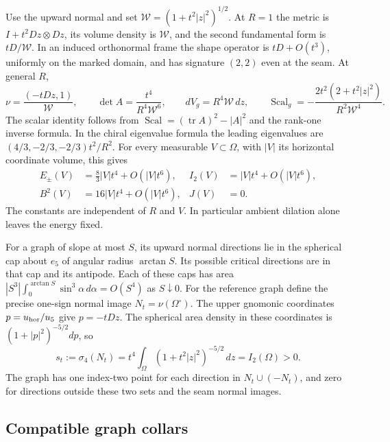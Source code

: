 \documentclass[11pt,letterpaper]{article}
\numberwithin{equation}{section}
\theoremstyle{definition}
\DeclareMathOperator{\Scal}{Scal}
\begin{document}
Use the upward normal and set \(\mathcal W=(1+t^2|z|^2)^{1/2}\).
At \(R=1\) the metric is \(I+t^2Dz\otimes Dz\), its volume
density is \(\mathcal W\), and the second fundamental form is
\(tD/\mathcal W\). In an induced orthonormal frame the shape operator
is \(tD+O(t^3)\), uniformly on the marked domain, and has signature
\((2,2)\) even at the seam. At general \(R\),
\[
 \nu=\frac{(-tDz,1)}{\mathcal W},\qquad
 \det A=\frac{t^4}{R^4\mathcal W^6},\qquad
 dV_g=R^4\mathcal W\,dz,\qquad
 \Scal_g=-\frac{2t^2(2+t^2|z|^2)}{R^2\mathcal W^4}.
\]
The scalar identity follows from
\(\Scal=(\operatorname{tr}A)^2-|A|^2\) and the rank-one
inverse formula. In the chiral eigenvalue formula the leading
eigenvalues are \( (4/3,-2/3,-2/3)t^2/R^2\).
For every measurable \(V\subset\Omega\), with \(|V|\) its
horizontal coordinate volume, this gives
\begin{equation}\label{eq:scale}
 \begin{aligned}
 E_\pm(V)&=\tfrac83 |V|t^4+O(|V|t^6),&
 I_2(V)&=|V|t^4+O(|V|t^6),\\
 B^2(V)&=16|V|t^4+O(|V|t^6),& J(V)&=0 .
 \end{aligned}
\end{equation}
The constants are independent of \(R\) and \(V\). In particular
ambient dilation alone leaves the energy fixed.

For a graph of slope at most \(S\), its upward normal directions
lie in the spherical cap about \(e_5\) of angular radius
\(\arctan S\). Its possible critical directions are in that
cap and its antipode. Each of these caps has area
\(|S^3|\int_0^{\arctan S}\sin^3\alpha\,d\alpha=O(S^4)\)
as \(S\downarrow0\). For the reference graph define the precise
one-sign normal image \(N_t=\nu(\Omega^\circ)\). The upper
gnomonic coordinates \(p=u_{\rm hor}/u_5\) give \(p=-tDz\).
The spherical area density in these coordinates is
\((1+|p|^2)^{-5/2}dp\), so
\begin{equation}\label{eq:normal-area}
       s_t:=\sigma_4(N_t)
       =t^4\int_\Omega(1+t^2|z|^2)^{-5/2}\,dz
       =I_2(\Omega)>0 .
\end{equation}
The graph has one index-two point for each direction in
\(N_t\cup(-N_t)\), and zero for directions outside these two
sets and the seam normal images.

\subsection{Compatible graph collars}
\end{document}
